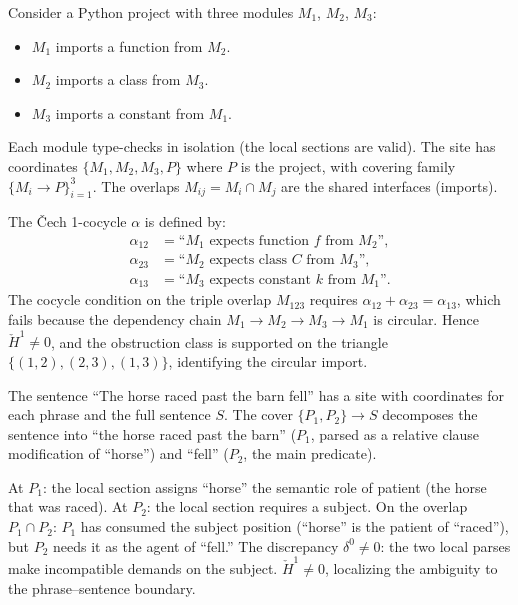 \begin{example}
\label{ex:cech:programs}
Consider a Python project with three modules $M_1$, $M_2$, $M_3$:
\begin{itemize}[nosep]
\item $M_1$ imports a function from $M_2$.
\item $M_2$ imports a class from $M_3$.
\item $M_3$ imports a constant from $M_1$.
\end{itemize}
Each module type-checks in isolation (the local sections are valid).
The site has coordinates $\{M_1, M_2, M_3, P\}$ where $P$ is the
project, with covering family $\{M_i \to P\}_{i=1}^{3}$.  The
overlaps $M_{ij} = M_i \cap M_j$ are the shared interfaces (imports).

The \v{C}ech 1-cocycle $\alpha$ is defined by:
\begin{align*}
  \alpha_{12} &= \text{``$M_1$ expects function $f$ from $M_2$''}, \\
  \alpha_{23} &= \text{``$M_2$ expects class $C$ from $M_3$''}, \\
  \alpha_{13} &= \text{``$M_3$ expects constant $k$ from $M_1$''}.
\end{align*}
The cocycle condition on the triple overlap $M_{123}$ requires
$\alpha_{12} + \alpha_{23} = \alpha_{13}$, which fails because the
dependency chain $M_1 \to M_2 \to M_3 \to M_1$ is circular.  Hence
$\check{H}^1 \neq 0$, and the obstruction class is supported on the
triangle $\{(1,2), (2,3), (1,3)\}$, identifying the circular import.
\end{example}

\begin{example}
\label{ex:cech:nl}
The sentence ``The horse raced past the barn fell'' has a site with
coordinates for each phrase and the full sentence $S$.  The cover
$\{P_1, P_2\} \to S$ decomposes the sentence into ``the horse raced
past the barn'' ($P_1$, parsed as a relative clause modification of
``horse'') and ``fell'' ($P_2$, the main predicate).

At $P_1$: the local section assigns ``horse'' the semantic role of
patient (the horse that was raced).  At $P_2$: the local section
requires a subject.  On the overlap $P_1 \cap P_2$: $P_1$ has
consumed the subject position (``horse'' is the patient of ``raced''),
but $P_2$ needs it as the agent of ``fell.''  The discrepancy
$\delta^0 \neq 0$: the two local parses make incompatible demands on
the subject.  $\check{H}^1 \neq 0$, localizing the ambiguity to the
phrase--sentence boundary.
\end{example}

